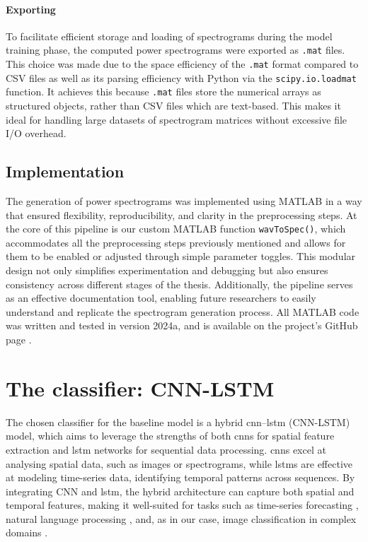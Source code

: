 \paragraph{Exporting}
To facilitate efficient storage and loading of spectrograms during the model training phase, the computed power spectrograms were exported as \texttt{.mat} files. This choice was made due to the space efficiency of the \texttt{.mat} format compared to CSV files as well as its parsing efficiency with Python via the \texttt{scipy.io.loadmat} function. It achieves this because \texttt{.mat} files store the numerical arrays as structured objects, rather than CSV files which are text-based. This makes it ideal for handling large datasets of spectrogram matrices without excessive file I/O overhead. 

\subsection{Implementation}

The generation of power spectrograms was implemented using MATLAB in a way that ensured flexibility, reproducibility, and clarity in the preprocessing steps. At the core of this pipeline is our custom MATLAB function \texttt{wavToSpec()}, which accommodates all the preprocessing steps previously mentioned and allows for them to be enabled or adjusted through simple parameter toggles. This modular design not only simplifies experimentation and debugging but also ensures consistency across different stages of the thesis. Additionally, the pipeline serves as an effective documentation tool, enabling future researchers to easily understand and replicate the spectrogram generation process. All MATLAB code was written and tested in version 2024a, and is available on the project's GitHub page \cite{dhand_thesis-ml_2024}.

\section{The classifier: CNN-LSTM}\label{sec:cnn-lstm-overview}

The chosen classifier for the baseline model is a hybrid \acrlong{cnn}--\acrlong{lstm} (CNN-LSTM) model, which aims to leverage the strengths of both \acrshort{cnn}s for spatial feature extraction and \acrshort{lstm} networks for sequential data processing. \acrshort{cnn}s excel at analysing spatial data, such as images or spectrograms, while \acrshort{lstm}s are effective at modeling time-series data, identifying temporal patterns across sequences. By integrating CNN and \acrshort{lstm}, the hybrid architecture can capture both spatial and temporal features, making it well-suited for tasks such as time-series forecasting \cite{kim_predicting_2019, lu_cnn-lstm-based_2020}, natural language processing \cite{wang_dimensional_2016, umer_fake_2020}, and, as in our case, image classification in complex domains \cite{vankdothu_brain_2022, islam_combined_2020}. 

